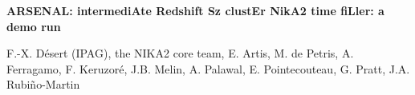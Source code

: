 \documentclass[10pt,a4paper,twoside,graphicx,color]{article}
\begin{document}
%
%
\begin{center}{\huge \bf
ARSENAL: intermediAte Redshift Sz clustEr NikA2 time fiLler: a demo run
}\end{center}
% 
\begin{center}
  F.-X. D\'esert (IPAG), the NIKA2 core team, E. Artis, M. de Petris,
  A. Ferragamo, F. Keruzoré, J.B. Melin, A. Palawal, E. Pointecouteau,
  G. Pratt, J.A. Rubiño-Martin
%   
% 

\end{center}
\end{document}

